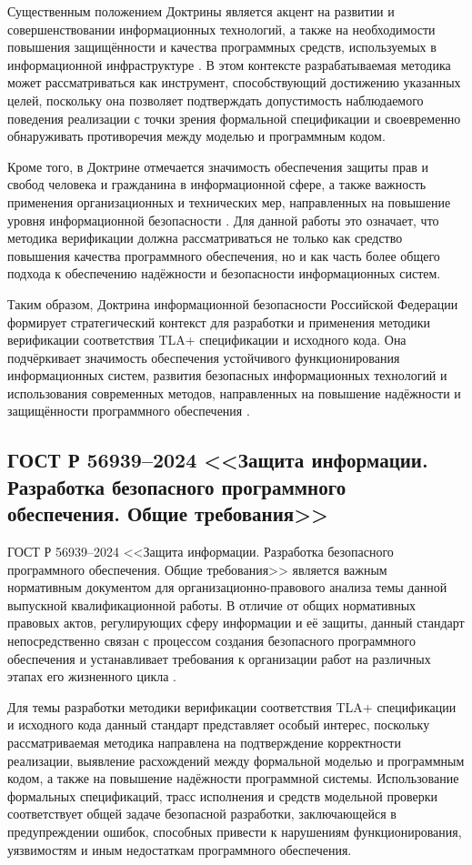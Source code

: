 Существенным положением Доктрины является акцент на развитии и
совершенствовании информационных технологий, а также на необходимости
повышения защищённости и качества программных средств, используемых в
информационной инфраструктуре \cite{doctrine_ib_rf}. В этом контексте
разрабатываемая методика может рассматриваться как инструмент,
способствующий достижению указанных целей, поскольку она позволяет
подтверждать допустимость наблюдаемого поведения реализации с точки зрения
формальной спецификации и своевременно обнаруживать противоречия между
моделью и программным кодом.

Кроме того, в Доктрине отмечается значимость обеспечения защиты прав и
свобод человека и гражданина в информационной сфере, а также важность
применения организационных и технических мер, направленных на повышение
уровня информационной безопасности \cite{doctrine_ib_rf}. Для данной
работы это означает, что методика верификации должна рассматриваться не
только как средство повышения качества программного обеспечения, но и как
часть более общего подхода к обеспечению надёжности и безопасности
информационных систем.

Таким образом, Доктрина информационной безопасности Российской Федерации
формирует стратегический контекст для разработки и применения методики
верификации соответствия TLA+ спецификации и исходного кода. Она
подчёркивает значимость обеспечения устойчивого функционирования
информационных систем, развития безопасных информационных технологий и
использования современных методов, направленных на повышение надёжности и
защищённости программного обеспечения \cite{doctrine_ib_rf}.

\subsection{ГОСТ Р 56939--2024 <<Защита информации. Разработка безопасного программного обеспечения. Общие требования>>}

ГОСТ Р 56939--2024 <<Защита информации. Разработка безопасного
программного обеспечения. Общие требования>> является важным нормативным
документом для организационно-правового анализа темы данной выпускной
квалификационной работы. В отличие от общих нормативных правовых актов,
регулирующих сферу информации и её защиты, данный стандарт непосредственно
связан с процессом создания безопасного программного обеспечения и
устанавливает требования к организации работ на различных этапах его
жизненного цикла \cite{gost_56939_2024}.

Для темы разработки методики верификации соответствия TLA+ спецификации и
исходного кода данный стандарт представляет особый интерес, поскольку
рассматриваемая методика направлена на подтверждение корректности
реализации, выявление расхождений между формальной моделью и программным
кодом, а также на повышение надёжности программной системы. Использование
формальных спецификаций, трасс исполнения и средств модельной проверки
соответствует общей задаче безопасной разработки, заключающейся в
предупреждении ошибок, способных привести к нарушениям функционирования,
уязвимостям и иным недостаткам программного обеспечения.

